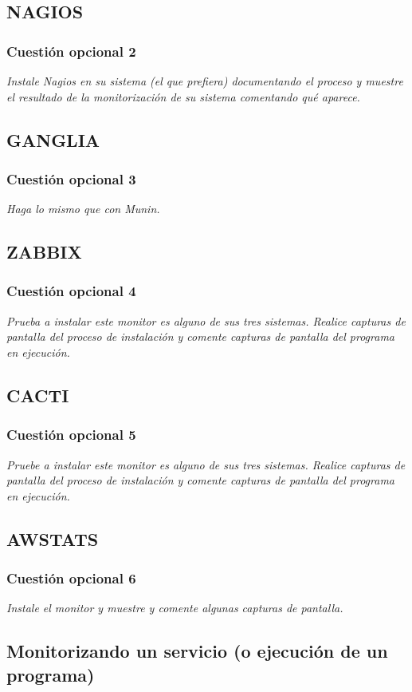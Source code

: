 \subsection{NAGIOS}
\subsubsection{Cuestión opcional 2}
\textit{Instale Nagios en su sistema (el que prefiera) documentando el proceso y muestre el resultado de la monitorización de su sistema comentando qué aparece.}
\subsection{GANGLIA}
\subsubsection{Cuestión opcional 3}
\textit{Haga lo mismo que con Munin.}
\subsection{ZABBIX}
\subsubsection{Cuestión opcional 4}
\textit{Prueba a instalar este monitor es alguno de sus tres sistemas. Realice capturas de pantalla del proceso de instalación y comente capturas de pantalla del programa en ejecución.}
\subsection{CACTI}
\subsubsection{Cuestión opcional 5}
\textit{Pruebe a instalar este monitor es alguno de sus tres sistemas. Realice capturas de pantalla del proceso de instalación y comente capturas de pantalla del programa en ejecución.}
\subsection{AWSTATS}
\subsubsection{Cuestión opcional 6}
\textit{Instale el monitor y muestre y comente algunas capturas de pantalla.}
\subsection{Monitorizando un servicio (o ejecución de un programa)}
